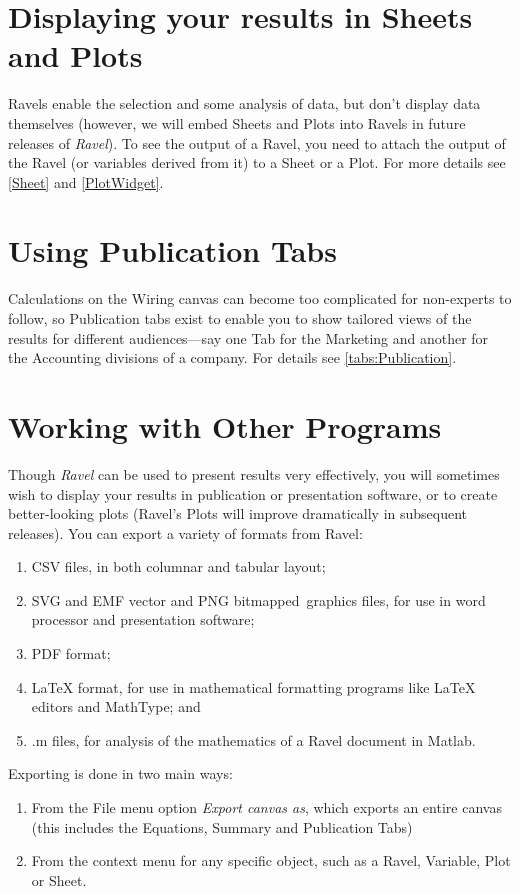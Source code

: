 \section{Displaying your results in Sheets and Plots}

Ravels enable the selection and some analysis of data, but don't display
data themselves (however, we will embed Sheets and Plots into Ravels
in future releases of \emph{Ravel}). To see the output of a Ravel,
you need to attach the output of the Ravel (or variables derived from
it) to a Sheet or a Plot. For more details see \ref{Sheet} and \ref{PlotWidget}.

\section{Using Publication Tabs}

Calculations on the Wiring canvas can become too complicated for non-experts
to follow, so Publication tabs exist to enable you to show tailored
views of the results for different audiences---say one Tab for the
Marketing and another for the Accounting divisions of a company. For
details see \ref{tabs:Publication}.

\section{Working with Other Programs \label{Export}}

Though \emph{Ravel} can be used to present results very effectively,
you will sometimes wish to display your results in publication or
presentation software, or to create better-looking plots (Ravel's
Plots will improve dramatically in subsequent releases). You can export
a variety of formats from Ravel:
\begin{enumerate}
\item CSV files, in both columnar and tabular layout;
\item SVG and EMF vector and PNG bitmapped~graphics files, for use in word
processor and presentation software;
\item PDF format;
\item LaTeX format, for use in mathematical formatting programs like LaTeX
editors and MathType; and
\item .m files, for analysis of the mathematics of a Ravel document in Matlab.
\end{enumerate}
Exporting is done in two main ways:
\begin{enumerate}
\item From the File menu option \emph{Export canvas as}, which exports an
entire canvas (this includes the Equations, Summary and Publication
Tabs)
\item From the context menu for any specific object, such as a Ravel, Variable,
Plot or Sheet.
\end{enumerate}


